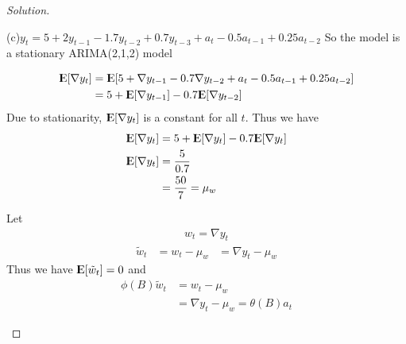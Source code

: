 \documentclass[UTF8,a4paper,14pt]{ctexart}
\newcommand{\E}{{\rm I\kern-.3em E}}
\newcommand{\Var}{\mathrm{Var}}
\newenvironment{solution}
  {\renewcommand\qedsymbol{$\blacksquare$}\begin{proof}[Solution]}
  {\end{proof}}
\theoremstyle{definition}
\theoremstyle{remark}
\begin{document}
\begin{solution}
\begin{mybox}{(c)\(y_t = 5+2y_{t-1}-1.7y_{t-2}+0.7y_{t-3}+a_t-0.5 a_{t-1}+0.25 a_{t-2}\)}
    So the model is a stationary ARIMA(2,1,2) model


    \tcbsubtitle{\(\E[\nabla y_t ]\)} 
    \begin{equation*}
      \begin{aligned}
        \E[\nabla y_t] 
        &=\E[5+\nabla y_{t-1}-0.7\nabla y_{t-2}+a_t-0.5 a_{t-1}+0.25 a_{t-2}]\\
        &=5+\E[\nabla y_{t-1}]-0.7\E[\nabla y_{t-2}]\\
      \end{aligned}
    \end{equation*}
    Due to stationarity,  \(\E[\nabla y_t]\) is a constant for all \(t\). Thus we have
    \begin{equation*}
      \begin{aligned}
        \E[\nabla y_t] 
        &=5+\E[\nabla y_{t}]-0.7\E[\nabla y_{t}]\\
        \E[\nabla y_{t}]
        &=\frac{5}{0.7}\\
        &=\frac{50}{7} = \mu_w
      \end{aligned}
    \end{equation*}

    
    
    \tcbsubtitle{\(\Var[\nabla y_t ]\)}  


    Let
    \begin{equation*}
      \begin{aligned}
        w_t = \nabla y_t
      \end{aligned}
    \end{equation*}
    \begin{equation*}
      \begin{aligned}
        \tilde{w}_t &= w_t-\mu_w
        &= \nabla y_t -\mu_w
      \end{aligned}
    \end{equation*}
    Thus we have \(\E[\tilde{w}_t]=0\) and
    \begin{equation*}
      \begin{aligned}
        \phi(B)\tilde{w}_t &= w_t-\mu_w\\
        &= \nabla y_t -\mu_w=\theta(B)a_t
      \end{aligned}
    \end{equation*}


\end{mybox}
\end{solution}
\end{document}
